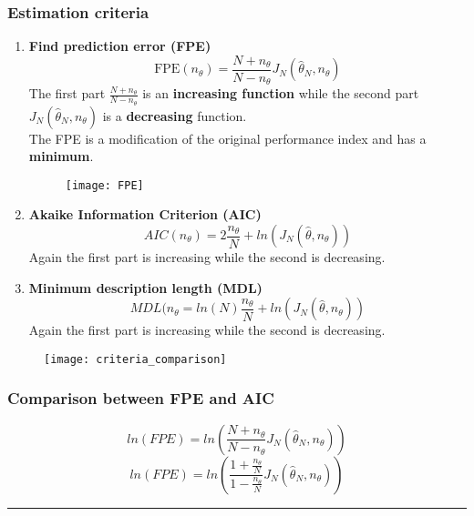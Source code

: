 \subsubsection{Estimation criteria}
\begin{enumerate}
\item \textbf{Find prediction error (FPE)}\\
\[
\boxed{\text{FPE}(n_{\theta})= \frac{N+n_{\theta}}{N-n_{\theta}} J_N(\hat{\theta}_N,n_{\theta})}
\]
The first part $\frac{N+n_{\theta}}{N-n_{\theta}}$ is an \textbf{increasing function } while the second part $J_N(\hat{\theta}_N,n_{\theta})$ is a \textbf{decreasing} function.\\
The FPE is a modification of the original performance index and has a \textbf{minimum}.
\begin{figure}[H]
 \centering
  \texttt{[image: FPE]}
\end{figure}
\item \textbf{Akaike Information Criterion (AIC)}\\
\[
\boxed{AIC(n_\theta) = 2 \frac{n_{\theta}}{N}+ ln(J_N(\hat{\theta},n_{\theta}))}
\]
Again the first part is increasing while the second is decreasing.
\item \textbf{Minimum description length (MDL)}\\
\[
\boxed{MDL(n_{\theta}=ln(N)\frac{n_{\theta}}{N}+ln(J_N(\hat{\theta},n_{\theta}))}
\]
Again the first part is increasing while the second is decreasing.
\end{enumerate}
\begin{figure}[H]
 \centering
  \texttt{[image: criteria\_comparison]}
\end{figure}


\subsubsection{Comparison between FPE and AIC}
$$ ln(FPE) = ln(\frac{N+n_{\theta}}{N-n_{\theta}} J_N(\hat{\theta}_N,n_{\theta}))$$
$$ ln(FPE) = ln(\frac{1+\frac{n_{\theta}}{N}}{1-\frac{n_{\theta}}{N}} J_N(\hat{\theta}_N,n_{\theta}))$$
\newpage
\par\noindent\rule{\textwidth}{0.4pt}

